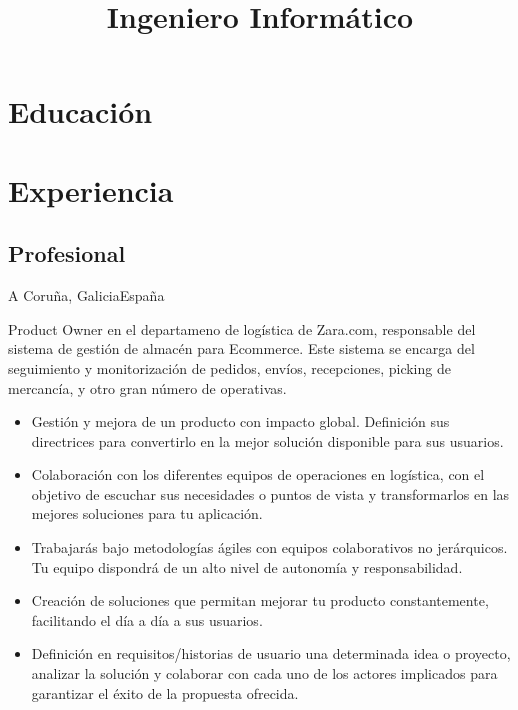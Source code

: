 \documentclass[11pt,a4paper,sans]{moderncv}        %
\title{Ingeniero Informático}
\begin{document}
\makecvtitle

\section{Educación}

\section{Experiencia}
\subsection{Profesional}
 {A Coru\~{n}a, Galicia}{Espa\~{n}a}{
Product Owner en el departameno de logística de Zara.com, responsable del sistema de gestión de almacén para Ecommerce. Este sistema se encarga del seguimiento y monitorización de pedidos, envíos, recepciones, picking de mercancía, y otro gran número de operativas. 
\begin{itemize}%
\item Gestión y mejora de un producto con impacto global. Definición sus directrices para convertirlo en la mejor solución disponible para sus usuarios.
\item Colaboración con los diferentes equipos de operaciones en logística, con el objetivo de escuchar sus necesidades o puntos de vista y transformarlos en las mejores soluciones para tu aplicación.
\item Trabajarás bajo metodologías ágiles con equipos colaborativos no jerárquicos. Tu equipo dispondrá de un alto nivel de autonomía y responsabilidad.
\item Creación de soluciones que permitan mejorar tu producto constantemente, facilitando el día a día a sus usuarios.
\item Definición en requisitos/historias de usuario una determinada idea o proyecto, analizar la solución y colaborar con cada uno de los actores implicados para garantizar el éxito de la propuesta ofrecida.
\end{itemize}}
\end{document}

